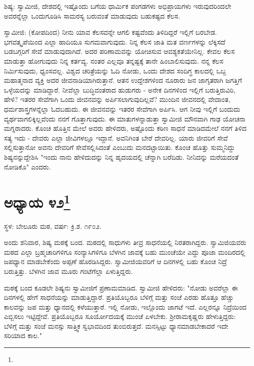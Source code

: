 ಶಿಷ್ಯ: ಸ್ವಾಮೀಜಿ, ದೇಶದಲ್ಲಿ ಇಷ್ಟೊಂದು ಬಗೆಯ ಧಾರ್ಮಿಕ ಪಂಗಡಗಳು ಅಭಿಪ್ರಾಯಗಳು ಇರುವುದರಿಂದಲೇ ಅವರನ್ನೆಲ್ಲಾ ಒಂದುಗೂಡಿಸಿ ಸಾಮರಸ್ಯ ಬರುವಂತೆ ಮಾಡುವುದು ಬಹುಕಷ್ಟದ ಕೆಲಸ.

ಸ್ವಾಮೀಜಿ: (ಕೋಪದಿಂದ) ನೀನು ಯಾವ ಕೆಲಸವನ್ನೇ ಆಗಲಿ ಕಷ್ಟವೆಂದು ತಿಳಿದಿದ್ದರೆ ಇಲ್ಲಿಗೆ ಬರಬೇಡ. ಭಗವತ್ಕೃಪೆಯಿಂದ ಎಲ್ಲಾ ಹಾದಿಯೂ ಸುಗಮವಾಗುವುದು. ನಿನ್ನ ಕೆಲಸ ಜಾತಿ ಮತ ವರ್ಣಗಳನ್ನು ಲೆಕ್ಕಿಸದೆ ಬಡಬಗ್ಗರಿಗೆ ಸೇವೆ ಮಾಡುವುದಾಗಿದೆ. ಅದರ ಪರಿಣಾಮವನ್ನು ಯೋಚಿಸುವ ಆವಶ್ಯಕತೆಯೇನಿಲ್ಲ. ಕೇವಲ ಕೆಲಸ ಮಾಡುತ್ತಾ ಹೋಗುವುದು ನಿನ್ನ ಕರ್ತವ್ಯ. ನಂತರ ಎಲ್ಲವೂ ತನ್ನಷ್ಟಕ್ಕೆ ತಾನೇ ಹಿಂಬಾಲಿಸುವುದು. ನನ್ನ ಕೆಲಸ ನಿರ್ಮಿಸುವುದು, ಧ್ವಂಸವಲ್ಲ. ವಿಶ್ವದ ಚರಿತ್ರೆಯನ್ನು ಓದಿ ನೋಡು, ಒಂದು ದೇಶದ ಸಂದಿಗ್ಧ ಕಾಲದಲ್ಲಿ ಒಬ್ಬ ಮಹಾತ್ಮನಾದ ವ್ಯಕ್ತಿ ಅದರ ಜೀವನಾಡಿಯಾಗಿರುತ್ತಾನೆ. ಆತನ ಉದ್ದೇಶಗಳಿಂದ ನೂರಾರು ಜನ ಜಾಗೃತರಾಗಿ ಜಗತ್ತಿಗೆ ಒಳ್ಳೆಯದನ್ನು ಮಾಡಿದ್ದಾರೆ. ನೀವೆಲ್ಲಾ ಬುದ್ಧಿವಂತರಾದ ಹುಡುಗರು - ಅನೇಕ ದಿನಗಳಿಂದ ಇಲ್ಲಿಗೆ ಬರುತ್ತಿರುವಿರಿ, ಹೇಳಿ? ಇತರರ ಸೇವೆಗಾಗಿ ಒಂದು ಜೀವನವನ್ನು ಅರ್ಪಿಸಲಾಗುವುದಿಲ್ಲವೆ? ಮುಂದಿನ ಜೀವನದಲ್ಲಿ ವೇದಾಂತ, ಧರ್ಮಶಾಸ್ತ್ರಗಳನ್ನೆಲ್ಲಾ ಓದಬಹುದು. ಈ ಜೀವನವನ್ನು ಇತರರ ಸೇವೆಗಾಗಿ ಅರ್ಪಿಸಿ. ಆಗ ನೀವು ಇಲ್ಲಿಗೆ ಬಂದುದು ವ್ಯರ್ಥವಾಗಲಿಕ್ಕಿಲ್ಲವೆಂದು ನನಗೆ ಗೊತ್ತಾಗುವುದು. ಈ ಮಾತುಗಳನ್ನಾಡುತ್ತಾ ಸ್ವಾಮೀಜಿ ಮೌನವಾಗಿ ಗಾಢ ಯೋಚನಾ ಮಗ್ನರಾದರು. ಕೊಂಚ ಹೊತ್ತಿನ ಮೇಲೆ ಅವರು ಹೇಳಿದರು, ಅಷ್ಟೊಂದು ಕಠಿಣ ಸಾಧನೆ ಮಾಡಿದಮೇಲೆ ನನಗೆ ತಿಳಿದ ಸತ್ಯ ಇದು - ದೇವರು ಎಲ್ಲಾ ಜೀವಿಗಳಲ್ಲೂ ಇದ್ದಾನೆ. ಅವನಿಗಿಂತ ಬೇರೆ ದೇವರಿಲ್ಲ. ಯಾರು ಜೀವರಿಗೆ ಸೇವೆ ಸಲ್ಲಿಸುತ್ತಾನೋ ಅವನು ದೇವರಿಗೆ ಸೇವೆಸಲ್ಲಿಸಿದಂತೆ ಎಂಬುದು ಮನದಟ್ಟಾಯಿತು. ಕೊಂಚ ಹೊತ್ತು ಸುಮ್ಮನಿದ್ದು ಶಿಷ್ಯನನ್ನುದ್ದೇಶಿಸಿ "ಇಂದು ನಾನು ಹೇಳಿದುದನ್ನು ನಿನ್ನ ಹೃದಯದಲ್ಲಿ ಚೆನ್ನಾಗಿ ಬರೆದಿಡು. ನೀನಿದನ್ನು ಮರೆಯದಂತೆ ನೋಡಿಕೊ" ಎಂದರು.

\newpage

\chapter[ಅಧ್ಯಾಯ ೪೨]{ಅಧ್ಯಾಯ ೪೨\protect\footnote{}}

\begin{center}
ಸ್ಥಳ: ಬೇಲೂರು ಮಠ, ವರ್ಷ: ಕ್ರಿ.ಶ. ೧೯೦೨.
\end{center}

ಅಂದು ಶನಿವಾರ, ಶಿಷ್ಯ ಮಠಕ್ಕೆ ಬಂದ. ಮಠದಲ್ಲಿ ಸಾಧುಗಳು ತೀವ್ರ ಸಾಧನೆಯಲ್ಲಿ ನಿರತರಾಗಿದ್ದರು. ಸ್ವಾಮಿಜಿಯವರು ಮಠದ ಎಲ್ಲಾ ಬ್ರಹ್ಮಚಾರಿಗಳಿಗೂ ಸಂನ್ಯಾಸಿಗಳಿಗೂ ಬೆಳಗಿನ ಜಾವಕ್ಕೆ ಬಹು ಮುಂಚೆಯೇ ಎದ್ದು ಪೂಜಾ ಮಂದಿರದಲ್ಲಿ ಜಪಧ್ಯಾನ ಮಾಡಬೇಕೆಂದು ಅಪ್ಪಣೆ ಹೊರಡಿಸಿದ್ದರು. ಸ್ವಾಮೀಜಿಯವರಿಗೆ ಆ ದಿನಗಳಲ್ಲಿ ಬಹು ಕೊಂಚ ನಿದ್ರೆ ಬರುತ್ತಿತ್ತು. ಬೆಳಗಿನ ಜಾವ ಮೂರು ಗಂಟೆಗೆಲ್ಲಾ ಏಳುತ್ತಿದ್ದರು.

ಮಠಕ್ಕೆ ಬಂದ ಕೂಡಲೇ ಶಿಷ್ಯನು ಸ್ವಾಮೀಜಿಗೆ ಪ್ರಣಾಮಮಾಡಿದ. ಸ್ವಾಮೀಜಿ ಹೇಳಿದರು: "ನೋಡು ಅವರೆಲ್ಲಾ ಈ ದಿನಗಳಲ್ಲಿ ಹೇಗೆ ಸಾಧನೆಯನ್ನು ಮಾಡುತ್ತಿದ್ದಾರೆ. ಪ್ರತಿಯೊಬ್ಬರೂ ಬೆಳಿಗ್ಗೆ ಮತ್ತು ಸಂಜೆ ಎರಡು ಹೊತ್ತೂ ಹೆಚ್ಚು ಕಾಲವನ್ನು ಜಪ ಮತ್ತು ಧ್ಯಾನದಲ್ಲಿ ಕಳೆಯುತ್ತಾರೆ. ಇಲ್ಲಿ ನೋಡು, ಇಲ್ಲೊಂದು ಜಾಗಟೆ ಇದೆ. ಎಲ್ಲರನ್ನೂ ನಿದ್ರೆಯಿಂದ ಎಬ್ಬಿಸಲು ಇಟ್ಟಿದ್ದೇವೆ. ಪ್ರತಿಯೊಬ್ಬರೂ ಸೂರ್ಯೋದಯಕ್ಕೆ ಮುಂಚೆ ಏಳಬೇಕು. ಶ‍್ರೀರಾಮಕೃಷ್ಣರು ಹೇಳುತ್ತಿದ್ದರು: ಬೆಳಿಗ್ಗೆ ಮತ್ತು ಸಂಜೆ ಮನಸ್ಸು ಸಾತ್ತ್ವಿಕ ಸ್ವಭಾವದಿಂದ ತುಂಬಿರುತ್ತದೆ. ಮನಸ್ಸಿಟ್ಟು ಧ್ಯಾನಮಾಡಬೇಕಾದರೆ ಇದೇ ಸರಿಯಾದ ಕಾಲ."

